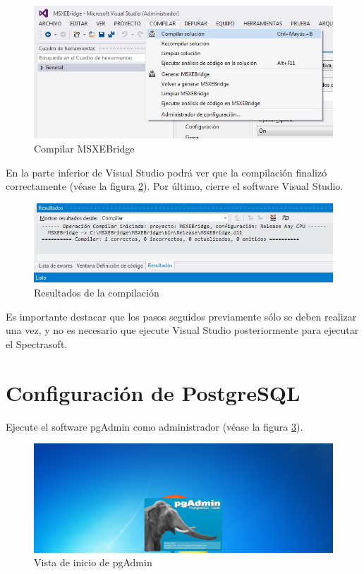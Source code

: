 \begin{figure}[H]
  \centering
  \includegraphics[width=1\linewidth]{./img/vs-compilar-solucion.jpg}
\caption[Compilar MSXEBridge]{Compilar MSXEBridge\label{fig:vs-compilar-solucion}}
\end{figure}

En la parte inferior de Visual Studio podr\'{a} ver que la compilaci\'{o}n finaliz\'{o} correctamente (v\'{e}ase la figura \ref{fig:vs-resultados}). Por \'{u}ltimo, cierre el software Visual Studio.

\begin{figure}[H]
  \centering
  \includegraphics[width=1\linewidth]{./img/vs-resultados.jpg}
\caption[Resultados de la compilaci\'{o}n]{Resultados de la compilaci\'{o}n\label{fig:vs-resultados}}
\end{figure}

Es importante destacar que los pasos seguidos previamente s\'{o}lo se deben realizar una vez, y no es necesario que ejecute Visual Studio posteriormente para ejecutar el Spectrasoft.

\newpage

\section{Configuraci\'{o}n de PostgreSQL}
	
Ejecute el software pgAdmin como administrador (v\'{e}ase la figura \ref{fig:pgadmin-inicio}).
	
\begin{figure}[H]
  \centering
  \includegraphics[width=1\linewidth]{./img/pgadmin-inicio.jpg}
\caption[Vista de inicio de pgAdmin]{Vista de inicio de pgAdmin\label{fig:pgadmin-inicio}}
\end{figure}


